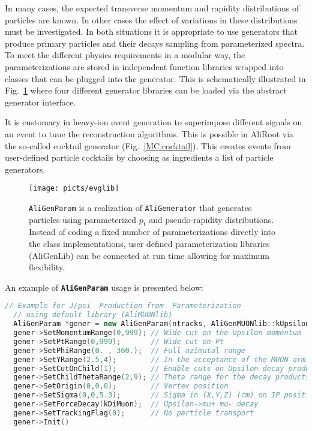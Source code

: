 \documentclass[12pt,a4paper,twoside]{article}
\newcommand{\class}[1]{\texttt{\textbf{#1}}\xspace}
\newcommand{\pt}{\ensuremath{p_{\mathrm{t}}}}
\begin{document}
In many cases, the expected transverse momentum and rapidity
distributions of particles are known. In other cases the effect of
variations in these distributions must be investigated. In both
situations it is appropriate to use generators that produce
primary particles and their decays sampling from parameterized
spectra. To meet the different physics requirements in a modular
way, the parameterizations are stored in independent function
libraries wrapped into classes that can be plugged into the
generator. This is schematically illustrated in
Fig.~\ref{MC:evglib} where four different generator libraries can
be loaded via the abstract generator interface.

It is customary in heavy-ion event generation to superimpose
different signals on an event to tune the reconstruction
algorithms. This is possible in AliRoot via the so-called cocktail
generator (Fig.~\ref{MC:cocktail}).  This creates events from
user-defined particle cocktails by choosing as ingredients a list
of particle generators.

\begin{figure}[ht]
  \centering
  \texttt{[image: picts/evglib]}
  \caption{\texttt{AliGenParam} is a realization of \texttt{AliGenerator}
    that generates particles using parameterized $\pt$ and
    pseudo-rapidity distributions. Instead of coding a fixed number of
    parameterizations directly into the class implementations, user
    defined parameterization libraries (AliGenLib) can be connected at
    run time allowing for maximum flexibility.} \label{MC:evglib}
\end{figure}

An example of \class{AliGenParam} usage is presented below:

\begin{lstlisting}[language=C++]
  // Example for J/psi  Production from  Parameterization 
  // using default library (AliMUONlib)                                       
  AliGenParam *gener = new AliGenParam(ntracks, AliGenMUONlib::kUpsilon);
  gener->SetMomentumRange(0,999); // Wide cut on the Upsilon momentum
  gener->SetPtRange(0,999);       // Wide cut on Pt
  gener->SetPhiRange(0. , 360.);  // Full azimutal range
  gener->SetYRange(2.5,4);        // In the acceptance of the MUON arm
  gener->SetCutOnChild(1);        // Enable cuts on Upsilon decay products
  gener->SetChildThetaRange(2,9); // Theta range for the decay products
  gener->SetOrigin(0,0,0);        // Vertex position
  gener->SetSigma(0,0,5.3);       // Sigma in (X,Y,Z) (cm) on IP position
  gener->SetForceDecay(kDiMuon);  // Upsilon->mu+ mu- decay
  gener->SetTrackingFlag(0);      // No particle transport
  gener->Init()
\end{lstlisting}
\end{document}
